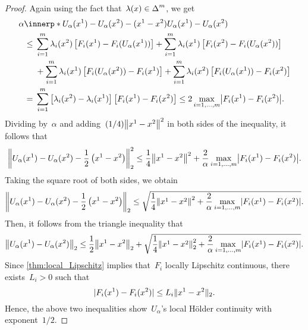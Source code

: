 \documentclass[../../main]{subfiles}
\begin{document}
\begin{proof}
    Again using the fact that~$\lambda(x) \in \operatorname{\Delta}^m$, we get
    \begin{align}
        \MoveEqLeft \alpha \innerp*{U_\alpha(x^1) - U_\alpha(x^2) - (x^1 - x^2)}{U_\alpha(x^1) - U_\alpha(x^2)} \\
        \le{}& \sum_{i = 1}^{m} \lambda_i(x^2) \left[ F_i(x^1) - F_i(U_\alpha(x^1)) \right] + \sum_{i = 1}^{m} \lambda_i(x^1) \left[ F_i(x^2) - F_i(U_\alpha(x^2)) \right] \\
           &+ \sum_{i = 1}^{m} \lambda_i(x^1) \left[ F_i(U_\alpha(x^2)) - F_i(x^1) \right] + \sum_{i = 1}^{m} \lambda_i(x^2) \left[ F_i(U_\alpha(x^1)) - F_i(x^2) \right] \\
        ={}& \sum_{i = 1}^{m} \left[ \lambda_i(x^2) - \lambda_i(x^1) \right] \left[ F_i(x^1) - F_i(x^2) \right] 
        \le 2 \max_{i = 1, \dots, m} \abs*{F_i(x^1) - F_i(x^2)}
    .\end{align}
    Dividing by~$\alpha$ and adding~$(1 / 4) \norm*{x^1 - x^2}^2$ in both sides of the inequality, it follows that
    \[
        \norm*{U_\alpha(x^1) - U_\alpha(x^2) - \frac{1}{2} \left( x^1 - x^2 \right) }_2^2 \le \frac{1}{4} \norm*{x^1 - x^2}^2 + \frac{2}{\alpha} \max_{i = 1, \dots, m} \abs*{F_i(x^1) - F_i(x^2)}
    .\] 
    Taking the square root of both sides, we obtain
    \[
        \norm*{U_\alpha(x^1) - U_\alpha(x^2) - \frac{1}{2} \left( x^1 - x^2 \right) }_2 \le \sqrt{\frac{1}{4} \norm*{x^1 - x^2}^2 + \frac{2}{\alpha} \max_{i = 1, \dots, m} \abs*{F_i(x^1) - F_i(x^2)}}
    .\] 
    Then, it follows from the triangle inequality that
    \[
        \norm*{U_\alpha(x^1) - U_\alpha(x^2)}_2 \le \frac{1}{2} \norm*{x^1 - x^2}_2 + \sqrt{\frac{1}{4} \norm*{x^1 - x^2}_2^2 + \frac{2}{\alpha} \max_{i = 1, \dots, m} \abs*{F_i(x^1) - F_i(x^2)}}
    .\] 
    Since \cref{thm:local_Lipschitz} implies that~$F_i$ locally Lipschitz continuous, there exists~$L_i > 0$ such that
    \[ \label{eq:cont_u_alpha:local_Lipschitz}
        \lvert F_i(x^1) - F_i(x^2)\rvert \le L_i \lVert x^1 - x^2\rVert_2
    .\] 
    Hence, the above two inequalities show~$U_\alpha$'s local H\"older continuity with exponent~$1 / 2$.


\end{proof}
\end{document}
